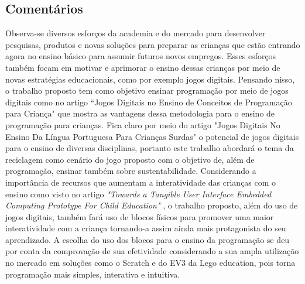 \subsection{Comentários}
Observa-se diversos esforços da academia e do mercado para desenvolver pesquisas, produtos e novas soluções para preparar as crianças que estão entrando agora no ensino básico para assumir futuros novos empregos. Esses esforços também focam em motivar e aprimorar o ensino dessas crianças por meio de novas estratégias educacionais, como  por exemplo jogos digitais. Pensando nisso, o trabalho proposto tem como objetivo ensinar programação por meio de jogos digitais como no artigo “Jogos Digitais no Ensino de Conceitos de Programação para Criança" \cite{tadesco_2016} que mostra as vantagens dessa metodologia para o ensino de programação para crianças. Fica claro por meio do artigo "Jogos Digitais No Ensino Da Língua Portuguesa Para Crianças Surdas" \cite{liz_2017} o potencial de jogos digitais para o ensino de diversas disciplinas, portanto este trabalho abordará o tema da reciclagem como cenário do jogo proposto com o objetivo de, além de programação, ensinar também sobre sustentabilidade. Considerando a importância de recursos que aumentam a interatividade das crianças com o ensino como visto no artigo \textit{"Towards a Tangible User Interface Embedded Computing Prototype For Child Education"} \cite{carneiro_2018}, o trabalho proposto, além do uso de jogos digitais, também fará uso de blocos físicos para promover uma maior interatividade com a criança tornando-a assim ainda mais protagonista do seu aprendizado. A escolha do uso dos blocos para o ensino da programação se deu por conta da comprovação de sua efetividade considerando a sua ampla utilização no mercado em soluções como o Scratch e do EV3 da Lego education, pois torna programação mais simples, interativa e intuitiva. 




